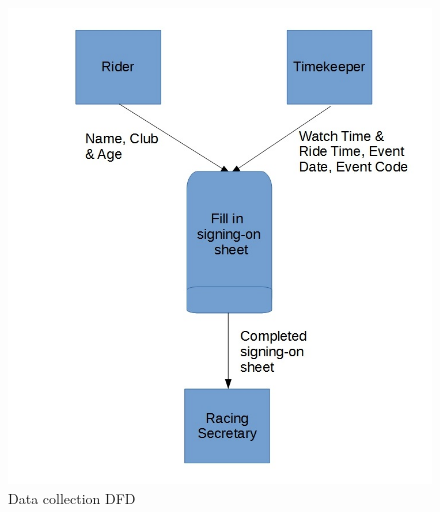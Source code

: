 \begin{figure}[H]
    \includegraphics[width=\textwidth]{./DFD/Done/JPG/DataCollection.jpg}
    \caption{Data collection DFD} \label{fig:Data collection DFD}
\end{figure}

